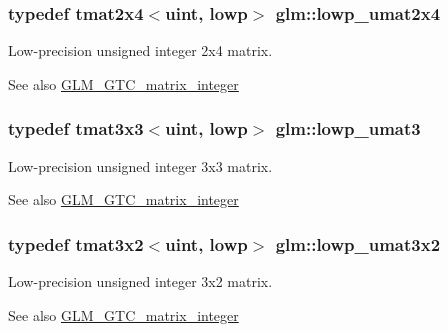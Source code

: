 \subsubsection[{lowp\+\_\+umat2x4}]{\setlength{\rightskip}{0pt plus 5cm}typedef tmat2x4$<${\bf uint}, lowp$>$ {\bf glm\+::lowp\+\_\+umat2x4}}\label{group__gtc__matrix__integer_gad5e8f08c103d5dd33767e31938357aa6}
Low-\/precision unsigned integer 2x4 matrix. \begin{DoxySeeAlso}{See also}
\hyperlink{group__gtc__matrix__integer}{G\+L\+M\+\_\+\+G\+T\+C\+\_\+matrix\+\_\+integer} 
\end{DoxySeeAlso}
\hypertarget{group__gtc__matrix__integer_ga71b66cc4f5e2d30b64ec99425562a6b6}{}
\subsubsection[{lowp\+\_\+umat3}]{\setlength{\rightskip}{0pt plus 5cm}typedef tmat3x3$<${\bf uint}, lowp$>$ {\bf glm\+::lowp\+\_\+umat3}}\label{group__gtc__matrix__integer_ga71b66cc4f5e2d30b64ec99425562a6b6}
Low-\/precision unsigned integer 3x3 matrix. \begin{DoxySeeAlso}{See also}
\hyperlink{group__gtc__matrix__integer}{G\+L\+M\+\_\+\+G\+T\+C\+\_\+matrix\+\_\+integer} 
\end{DoxySeeAlso}
\hypertarget{group__gtc__matrix__integer_ga3ea8482ddaa10befe8dc2d681d86bb59}{}
\subsubsection[{lowp\+\_\+umat3x2}]{\setlength{\rightskip}{0pt plus 5cm}typedef tmat3x2$<${\bf uint}, lowp$>$ {\bf glm\+::lowp\+\_\+umat3x2}}\label{group__gtc__matrix__integer_ga3ea8482ddaa10befe8dc2d681d86bb59}
Low-\/precision unsigned integer 3x2 matrix. \begin{DoxySeeAlso}{See also}
\hyperlink{group__gtc__matrix__integer}{G\+L\+M\+\_\+\+G\+T\+C\+\_\+matrix\+\_\+integer} 
\end{DoxySeeAlso}
\hypertarget{group__gtc__matrix__integer_gab27a50de8b11ec09b2f5cf1cf4c1a062}{}
